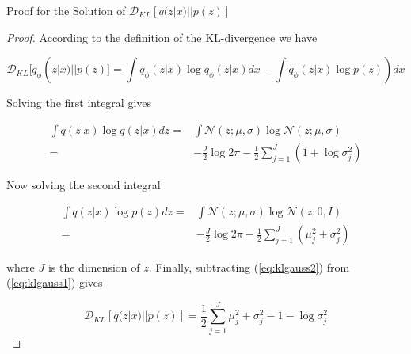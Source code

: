 \documentclass{beamer}
\newcommand{\kldiv}{\mathcal{D}_{KL}}
\begin{document}
\begin{frame}{Proof for the Solution of $\kldiv[q(z|x)||p(z)]$}
\begin{proof}
	\tiny
	According to the definition of the KL-divergence we have
	
	\vspace{-5pt}
	
	\begin{equation*}
	\kldiv[q_\phi(z|x)||p(z)] 
	= \int q_\phi(z|x)\log q_\phi(z|x)dx-\int q_\phi(z|x)\log p(z))dx
	\end{equation*}
	
	\vspace{-5pt}
	
	Solving the first integral gives
	
	\vspace{-5pt}
	
	\begin{equation}
		\begin{split}
			\int q(z|x)\log q(z|x)dz 
			=& \int \mathcal{N}(z;\mu, \sigma)\log \mathcal{N}(z;\mu, \sigma)\\
			=& -\frac{J}{2} \log 2\pi - \frac{1}{2}\sum_{j=1}^J (1+\log \sigma_j^2)
		\end{split}
		\label{eq:klgauss1}
	\end{equation}
	
	\vspace{-5pt}
	
	Now solving the second integral
	
	\vspace{-5pt}
	
	\begin{equation}
		\begin{split}
			\int q(z|x)\log p(z)dz 
			=& \int \mathcal{N}(z;\mu, \sigma)\log \mathcal{N}(z;0, I)\\
			=& -\frac{J}{2} \log 2\pi - \frac{1}{2}\sum_{j=1}^J (\mu_j^2+\sigma_j^2)
		\end{split}
	\label{eq:klgauss2}
	\end{equation}
	
	\vspace{-5pt}
	
	where $J$ is the dimension of $z$. Finally, subtracting (\ref{eq:klgauss2}) from (\ref{eq:klgauss1}) gives  
	
	\vspace{-5pt}
	
	\begin{equation*}
		\kldiv[q(z|x)||p(z)] 
		= \frac{1}{2}\sum_{j=1}^J \mu_j^2 + \sigma_j^2 - 1 - \log \sigma_j^2
	\end{equation*}
\end{proof}
\end{frame}
\end{document}
